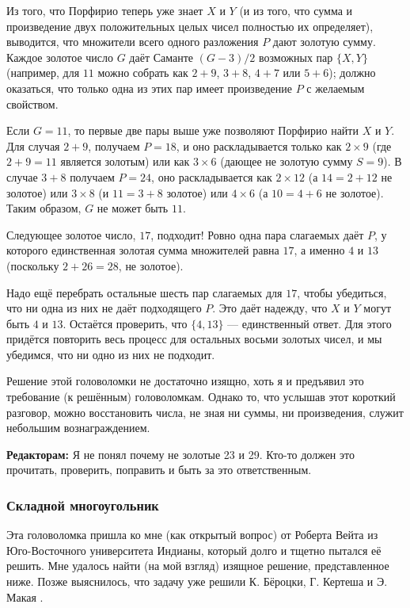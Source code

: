 Из того, что Порфирио теперь уже знает $X$ и $Y$ (и из того, что сумма и произведение двух положительных целых чисел полностью их определяет), выводится, что множители всего одного разложения $P$ дают золотую сумму. 
Каждое золотое число $G$ даёт Саманте $(G - 3)/2$ возможных пар $\{X, Y\}$
(например, для $11$ можно собрать как $2 + 9$, $3 + 8$, $4 + 7$ или $5 + 6$); должно оказаться, что только одна из этих пар имеет произведение $P$ с желаемым свойством.

Если $G = 11$, то первые две пары выше уже позволяют Порфирио найти $X$ и $Y$.
Для случая $2 + 9$, получаем $P = 18$, и оно раскладывается только как $2 \times 9$ (где $2 + 9 = 11$ является золотым) или как $3 \times 6$ (дающее не золотую сумму $S = 9$).
В случае $3 + 8$ получаем $P = 24$, оно раскладывается как $2 \times 12$ (а $14=2+12$ не золотое) или
$3 \times 8$ (и $11=3+8$ золотое) или $4 \times 6$ (а $10=4+6$ не золотое).
Таким образом, $G$ не может быть $11$.

Следующее золотое число, $17$, подходит!
Ровно одна пара слагаемых даёт $P$, у которого единственная золотая сумма множителей равна $17$, а именно $4$ и $13$ (поскольку $2 + 26 = 28$, не золотое).

Надо ещё перебрать остальные шесть пар слагаемых для $17$, чтобы убедиться, что ни одна из них не даёт подходящего $P$.
Это даёт надежду, что $X$ и $Y$ могут быть $4$ и $13$.
Остаётся проверить, что $\{4, 13\}$ --- единственный ответ.
Для этого придётся повторить весь процесс для остальных восьми золотых чисел, 
и мы убедимся, что ни одно из них не подходит.

Решение этой головоломки не достаточно изящно,
хоть я и предъявил это требование (к решённым) головоломкам.
Однако то, что услышав этот короткий разговор, можно восстановить числа, не зная ни суммы, ни произведения, служит небольшим вознаграждением.

\begin{addedbytheeditors}
\textbf{Редакторам:}
Я не понял почему не золотые 23 и 29.
Кто-то должен это прочитать, проверить, поправить и быть за это ответственным.
\end{addedbytheeditors}

\subsubsection*{Складной многоугольник}

Эта головоломка пришла ко мне (как открытый вопрос) от Роберта Вейта из Юго-Восточного университета Индианы, который долго и тщетно пытался её решить.
Мне удалось найти (на мой взгляд) изящное решение, представленное ниже.
Позже выяснилось, что задачу уже решили К. Бёроцки, Г. Кертеша и Э. Макая \cite{9}.


